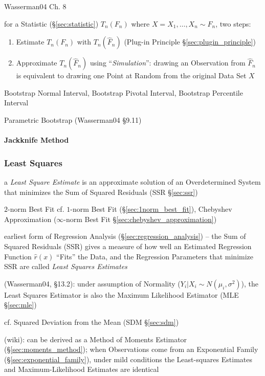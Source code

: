 Wasserman04 Ch. 8

for a Statistic (\S\ref{sec:statistic}) $T_n(F_n)$ where
$X = X_1, \ldots, X_n \sim F_n$, two steps:
\begin{enumerate}
  \item Estimate $T_n(F_n)$ with $T_n(\hat{F}_n)$ (Plug-in Principle
    \S\ref{sec:plugin_principle})
  \item Approximate $T_n(\hat{F}_n)$ using ``\emph{Simulation}'': drawing an
    Observation from $\hat{F}_n$ is equivalent to drawing one Point at Random
    from the original Data Set $X$
\end{enumerate}

Bootstrap Normal Interval, Bootstrap Pivotal Interval, Bootstrap Percentile
Interval

Parametric Bootstrap (Wasserman04 \S9.11)



\paragraph{Jackknife Method}\label{sec:jackknife_method}\hfill



\subsubsection{Least Squares}\label{sec:least_squares}

a \emph{Least Square Estimate} is an approximate solution of an Overdetermined
System that minimizes the Sum of Squared Residuals (SSR \S\ref{sec:ssr})

$2$-norm Best Fit \fist cf. $1$-norm Best Fit (\S\ref{sec:1norm_best_fit}),
Chebyshev Approximation ($\infty$-norm Best Fit
\S\ref{sec:chebyshev_approximation})

earliest form of Regression Analysis (\S\ref{sec:regression_analysis})
-- the Sum of Squared Residuals (SSR) gives a measure of how well
an Estimated Regression Function $\hat{r}(x)$ ``Fits'' the Data, and the
Regression Parameters that minimize SSR are called \emph{Least Squares
  Estimates}

(Wasserman04, \S13.2):
 under assumption of Normality ($Y_i | X_i \sim N(\mu_i, \sigma^2)$), the Least
 Squares Estimator is also the Maximum Likelihood Estimator (MLE
 \S\ref{sec:mle})

cf. Squared Deviation from the Mean (SDM \S\ref{sec:sdm})

(wiki): can be derived as a Method of Moments Estimator
(\S\ref{sec:moments_method});
when Observations come from an Exponential Family
(\S\ref{sec:exponential_family}), under mild conditions the Least-squares
Estimates and Maximum-Likelihood Estimates are identical



